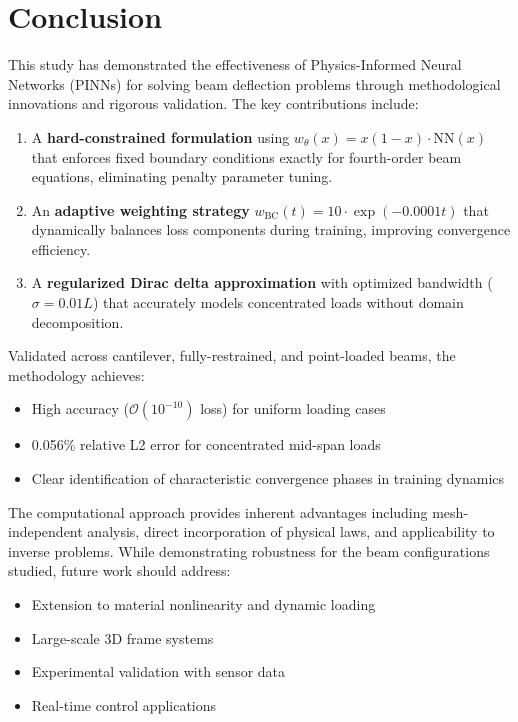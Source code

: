 \documentclass[twocolumn]{svjour3}
\begin{document}
	
	\section{Conclusion}\label{sec:conclusion}
	This study has demonstrated the effectiveness of Physics-Informed Neural Networks (PINNs) for solving beam deflection problems through methodological innovations and rigorous validation. The key contributions include:
	
	\begin{enumerate}
		\item A \textbf{hard-constrained formulation} using $w_{\theta}(x) = x(1-x)\cdot\text{NN}(x)$ that enforces fixed boundary conditions exactly for fourth-order beam equations, eliminating penalty parameter tuning.
		\item An \textbf{adaptive weighting strategy} $w_{\text{BC}}(t)=10\cdot\exp(-0.0001t)$ that dynamically balances loss components during training, improving convergence efficiency.
		\item A \textbf{regularized Dirac delta approximation} with optimized bandwidth ($\sigma = 0.01L$) that accurately models concentrated loads without domain decomposition.
	\end{enumerate}
	
	Validated across cantilever, fully-restrained, and point-loaded beams, the methodology achieves:
	\begin{itemize}
		\item High accuracy ($\mathcal{O}(10^{-10})$ loss) for uniform loading cases
		\item 0.056\% relative L2 error for concentrated mid-span loads
		\item Clear identification of characteristic convergence phases in training dynamics
	\end{itemize}
	
	The computational approach provides inherent advantages including mesh-independent analysis, direct incorporation of physical laws, and applicability to inverse problems. While demonstrating robustness for the beam configurations studied, future work should address:
	
	\begin{itemize}
		\item Extension to material nonlinearity and dynamic loading
		\item Large-scale 3D frame systems
		\item Experimental validation with sensor data
		\item Real-time control applications
	\end{itemize}
	
\end{document}
